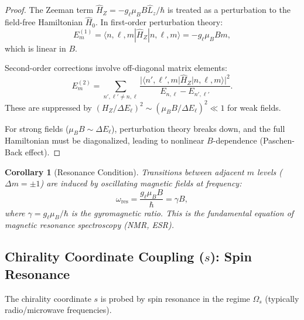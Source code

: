 \documentclass[twocolumn,10pt,a4paper]{article}
\newtheorem{corollary}[theorem]{Corollary}
\theoremstyle{remark}
\begin{document}
\begin{proof}
The Zeeman term $\hat{H}_Z = -g_\ell \mu_B B \hat{L}_z / \hbar$ is treated as a perturbation to the field-free Hamiltonian $\hat{H}_0$. In first-order perturbation theory:
\begin{equation}
E_m^{(1)} = \langle n, \ell, m | \hat{H}_Z | n, \ell, m \rangle = -g_\ell \mu_B B m,
\end{equation}
which is linear in $B$.

Second-order corrections involve off-diagonal matrix elements:
\begin{equation}
E_m^{(2)} = \sum_{n', \ell' \neq n, \ell} \frac{|\langle n', \ell', m | \hat{H}_Z | n, \ell, m \rangle|^2}{E_{n,\ell} - E_{n',\ell'}}.
\end{equation}
These are suppressed by $(H_Z / \Delta E_\ell)^2 \sim (\mu_B B / \Delta E_\ell)^2 \ll 1$ for weak fields.

For strong fields ($\mu_B B \sim \Delta E_\ell$), perturbation theory breaks down, and the full Hamiltonian must be diagonalized, leading to nonlinear $B$-dependence (Paschen-Back effect).
\end{proof}

\begin{corollary}[Resonance Condition]
\label{cor:magnetic_resonance}
Transitions between adjacent $m$ levels ($\Delta m = \pm 1$) are induced by oscillating magnetic fields at frequency:
\begin{equation}
\omega_{\text{res}} = \frac{g_\ell \mu_B B}{\hbar} = \gamma B,
\end{equation}
where $\gamma = g_\ell \mu_B / \hbar$ is the gyromagnetic ratio. This is the fundamental equation of magnetic resonance spectroscopy (NMR, ESR).
\end{corollary}

\subsection{Chirality Coordinate Coupling ($s$): Spin Resonance}

The chirality coordinate $s$ is probed by spin resonance in the regime $\Omega_s$ (typically radio/microwave frequencies).
\end{document}
